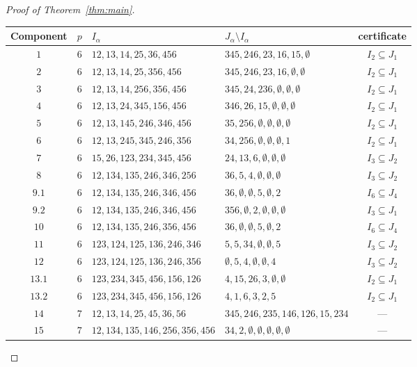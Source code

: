 \documentclass[11pt]{amsart}
\theoremstyle{remark}
\begin{document}
\begin{proof}[Proof of Theorem~\ref{thm:main}]
\begin{table}[ht]
\centering
\scriptsize
\setlength{\tabcolsep}{4pt}
\begin{tabular}{@{}ccllc@{}}
\toprule
Component & $p$ & $I_\alpha$ & $J_\alpha\setminus I_\alpha$ & certificate \\
\midrule
$1$ & $6$ & $12,13,14,25,36,456$ & $345,246,23,16,15,\emptyset$ & $I_{2}\subseteq J_{1}$ \\
$2$ & $6$ & $12,13,14,25,356,456$ & $345,246,23,16,\emptyset,\emptyset$ & $I_{2}\subseteq J_{1}$ \\
$3$ & $6$ & $12,13,14,256,356,456$ & $345,24,236,\emptyset,\emptyset,\emptyset$ & $I_{2}\subseteq J_{1}$ \\
$4$ & $6$ & $12,13,24,345,156,456$ & $346,26,15,\emptyset,\emptyset,\emptyset$ & $I_{2}\subseteq J_{1}$ \\
$5$ & $6$ & $12,13,145,246,346,456$ & $35,256,\emptyset,\emptyset,\emptyset,\emptyset$ & $I_{2}\subseteq J_{1}$ \\
$6$ & $6$ & $12,13,245,345,246,356$ & $34,256,\emptyset,\emptyset,\emptyset,1$ & $I_{2}\subseteq J_{1}$ \\
$7$ & $6$ & $15,26,123,234,345,456$ & $24,13,6,\emptyset,\emptyset,\emptyset$ & $I_{3}\subseteq J_{2}$ \\
$8$ & $6$ & $12,134,135,246,346,256$ & $36,5,4,\emptyset,\emptyset,\emptyset$ & $I_{3}\subseteq J_{2}$ \\
$9.1$ & $6$ & $12,134,135,246,346,456$ & $36,\emptyset,\emptyset,5,\emptyset,2$ & $I_{6}\subseteq J_{4}$ \\
$9.2$ & $6$ & $12,134,135,246,346,456$ & $356,\emptyset,2,\emptyset,\emptyset,\emptyset$ & $I_{3}\subseteq J_{1}$ \\
$10$ & $6$ & $12,134,135,246,356,456$ & $36,\emptyset,\emptyset,5,\emptyset,2$ & $I_{6}\subseteq J_{4}$ \\
$11$ & $6$ & $123,124,125,136,246,346$ & $5,5,34,\emptyset,\emptyset,5$ & $I_{3}\subseteq J_{2}$ \\
$12$ & $6$ & $123,124,125,136,246,356$ & $\emptyset,5,4,\emptyset,\emptyset,4$ & $I_{3}\subseteq J_{2}$ \\
$13.1$ & $6$ & $123,234,345,456,156,126$ & $4,15,26,3,\emptyset,\emptyset$ & $I_{2}\subseteq J_{1}$ \\
$13.2$ & $6$ & $123,234,345,456,156,126$ & $4,1,6,3,2,5$ & $I_{2}\subseteq J_{1}$ \\
$14$ & $7$ & $12,13,14,25,45,36,56$ & $345,246,235,146,126,15,234$ & --- \\
$15$ & $7$ & $12,134,135,146,256,356,456$ & $34,2,\emptyset,\emptyset,\emptyset,\emptyset,\emptyset$ & --- \\

\end{tabular}
\end{table}
\end{proof}
\end{document}
